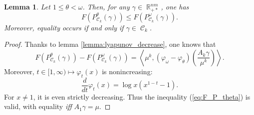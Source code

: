 \documentclass{article} %
\newcommand{\scal}[2]{\left\langle #1 , #2 \right\rangle}
\DeclareMathOperator{\IR}{\mathbb{R}}
\DeclareMathOperator{\Ccal}{\mathcal{C}}
\theoremstyle{plain}
\newtheorem{lemma}{Lemma}
\theoremstyle{definition}
\theoremstyle{remark}
\begin{document}
\begin{lemma}\label{lemma:F_P_theta}
	Let $1\le \theta < \omega$. Then, for any $\gamma \in \IR_{+*}^{nm}$, one has
	\begin{equation}\label{eq:F_P_theta}
	F(P^\theta_{\Ccal_k}(\gamma)) \le F(P^\omega_{\Ccal_k}(\gamma)).
	\end{equation}
	Moreover, equality occurs if and only if $\gamma \in \Ccal_k$.
\end{lemma}
\begin{proof}
	Thanks to lemma \ref{lemma:lyapunov_decrease}, one knows that
	\[
	F(P^\theta_{\Ccal_k}(\gamma)) - F(P^\omega_{\Ccal_k}(\gamma))
	= \scal{\mu^k}{(\varphi_\omega - \varphi_\theta) \left( \frac{A_k \gamma}{\mu^k} \right) } .
	\]
	Moreover, $t \in [1,\infty) \mapsto \varphi_t(x)$ is nonincreasing:
	\[
	\frac{d}{dt} \varphi_t(x) = \log x (x^{1-t} - 1).
	\]
	For $x\neq 1$, it is even strictly decreasing.
	Thus the inequality (\ref{eq:F_P_theta}) is valid, with equality \emph{iff} $A_1 \gamma = \mu$.
\end{proof}
\end{document}
